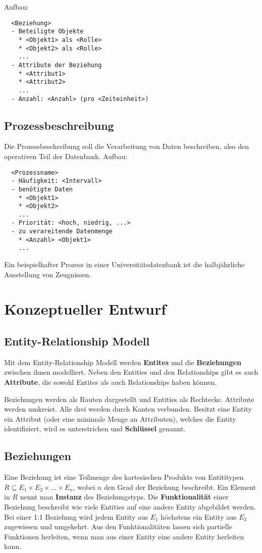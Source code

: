 \documentclass[a4paper, oneside]{book}
\begin{document}
  Aufbau:
  \begin{verbatim}
  <Beziehung>
  - Beteiligte Objekte
    * <Objekt1> als <Rolle>
    * <Objekt2> als <Rolle>
    ...
  - Attribute der Beziehung
    * <Attribut1>
    * <Attribut2>
    ...
  - Anzahl: <Anzahl> (pro <Zeiteinheit>)
  \end{verbatim}

  \subsection{Prozessbeschreibung}
  Die Prozessbeschreibung soll die Verarbeitung von Daten beschreiben, also den operativen Teil der Datenbank.
  Aufbau:  
  \begin{verbatim}
  <Prozessname>
  - Häufigkeit: <Intervall>
  - benötigte Daten
    * <Objekt1>
    * <Objekt2>
    ...
  - Priorität: <hoch, niedrig, ...>
  - zu verareitende Datenmenge
    * <Anzahl> <Objekt1>
    ...
  \end{verbatim}
  Ein beispielhafter Prozess in einer Universitätsdatenbank ist die halbjährliche Ausstellung von Zeugnissen.

  \section{Konzeptueller Entwurf}
  \subsection{Entity-Relationship Modell}
  Mit dem Entity-Relationship Modell werden \textbf{Entites} und die \textbf{Beziehungen} zwischen ihnen modelliert.
  Neben den Entities und den Relationships gibt es auch \textbf{Attribute}, die sowohl Entites als auch Relationships haben können.

  Beziehungen werden als Rauten dargestellt und Entities als Rechtecke. Attribute werden umkreist. Alle drei werden durch Kanten verbunden.
  Besitzt eine Entity ein Attribut (oder eine minimale Menge an Attributen), welches die Entity identifiziert,
  wird es unterstrichen und \textbf{Schlüssel} genannt.

  \subsection{Beziehungen}
  Eine Beziehung ist eine Teilmenge des kartesischen Produkts von Entititypen $R \subseteq E_1 \times E_2 \times ... \times E_n$, wobei $n$ den Grad der Beziehung beschreibt.
  Ein Element in $R$ nennt man \textbf{Instanz} des Beziehungstyps.
  Die \textbf{Funktionalität} einer Beziehung beschreibt wie viele Entities auf eine andere Entity abgebildet werden.
  Bei einer 1:1 Beziehung wird jedem Entity aus $E_1$ höchstens ein Entity aus $E_2$ zugewiesen und umgekehrt.
  Aus den Funktionalitäten lassen sich partielle Funktionen herleiten, wenn man aus einer Entity eine andere Entity herleiten kann.
\end{document}
